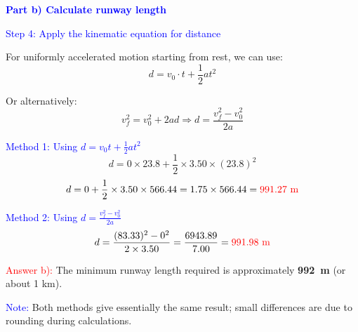 \begin{exercise}
\begin{solu}
        \vspace{0.5cm}

        \textbf{\textcolor{blue}{Part b) Calculate runway length}}

        \textcolor{blue}{Step 4: Apply the kinematic equation for distance}

        For uniformly accelerated motion starting from rest, we can use:
        \[
            \boxed{d = v_0 \cdot t + \frac{1}{2} a t^2}
        \]

        Or alternatively:
        \[
            \boxed{v_f^2 = v_0^2 + 2ad} \Rightarrow d = \frac{v_f^2 - v_0^2}{2a}
        \]

        \textcolor{blue}{Method 1: Using $d = v_0 t + \frac{1}{2}at^2$}
        \[
            d = 0 \times 23.8 + \frac{1}{2} \times 3.50 \times (23.8)^2
        \]
        \[
            d = 0 + \frac{1}{2} \times 3.50 \times 566.44 = 1.75 \times 566.44 = \textcolor{red}{991.27 \text{ m}}
        \]

        \textcolor{blue}{Method 2: Using $d = \frac{v_f^2 - v_0^2}{2a}$}
        \[
            d = \frac{(83.33)^2 - 0^2}{2 \times 3.50} = \frac{6943.89}{7.00} = \textcolor{red}{991.98 \text{ m}}
        \]

        \textcolor{red}{Answer b):} The minimum runway length required is approximately \textbf{\qty{992}{\m}} (or about 1 km).

        \textcolor{blue}{Note:} Both methods give essentially the same result; small differences are due to rounding during calculations.
    \end{solu}
\end{exercise}



